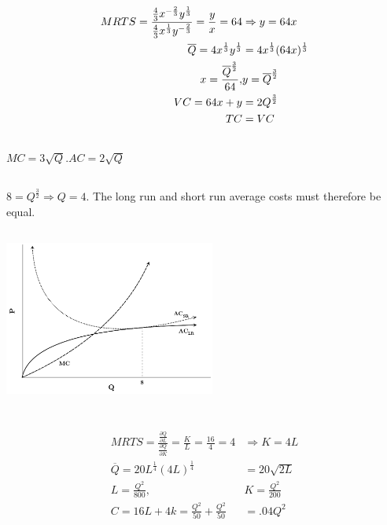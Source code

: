 \documentclass{article}
\begin{document}
	\subsection[c]{}
		\begin{align}
		\setcounter{equation}{0}
			MRTS = \frac{\frac{4}{3} x^{-\frac{2}{3}} y^{\frac{1}{3}}}{\frac{4}{3}x^{\frac{1}{3}} y^{-\frac{2}{3}}} = \frac{y}{x} =64  & \Rightarrow y = 64x \\
			\overline{Q} = 4x^{\frac{1}{3}}y^{\frac{1}{3}} &= 4x^{\frac{1}{3}}(64x)^{\frac{1}{3}} \\
			x = \frac{\overline{Q}^{\frac{3}{2}}}{64}, & y = \overline{Q}^\frac{3}{2} \\
			VC = 64x+y &= 2Q^\frac{3}{2} \\
			TC &= VC
		\end{align}
	\subsection[d]{}
		$ MC = 3 \sqrt{Q}. AC = 2\sqrt{Q} $
	\subsection[e]{}
		$ 8 = Q^\frac{3}{2} \Rightarrow Q=4.$ The long run and short run average costs must therefore be equal.
	\subsection[f]{}	
		\includegraphics[height=2in]{Charts/3e.pdf}
\section[4]{}
	\subsection[a]{}
	\setcounter{equation}{0}
		\begin{align}
			MRTS = \frac{\frac{\partial Q}{\partial L}}{\frac{\partial Q}{\partial K}} = \frac{K}{L} = \frac{16}{4} = 4 & \Rightarrow K=4L \\
			\overline{Q} = 20L^\frac{1}{4}(4L)^\frac{1}{4} &=20\sqrt{2L} \\
			L = \frac{Q^2}{800}, & K=\frac{Q^2}{200} \\
			C = 16L+4k=\frac{Q^2}{50} + \frac{Q^2}{50} &= .04Q^2
		\end{align}
\end{document}
